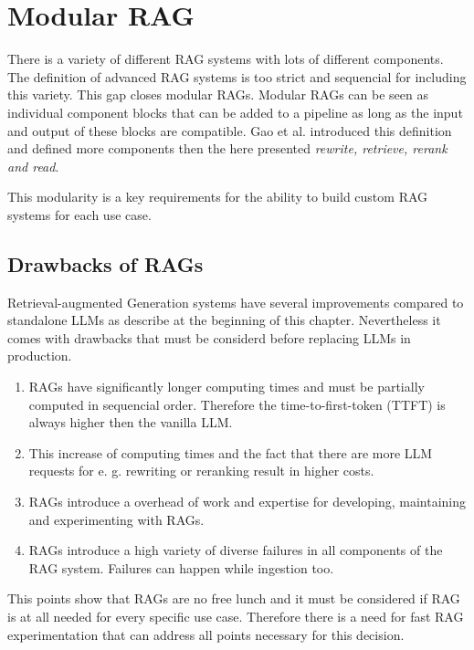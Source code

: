 \section{Modular RAG}

There is a variety of different RAG systems with lots of different components. The definition of advanced RAG systems is too strict and sequencial for including this variety. This gap closes modular RAGs. Modular RAGs can be seen as individual component blocks that can be added to a pipeline as long as the input and output of these blocks are compatible. Gao et al. introduced this definition and defined more components then the here presented \textit{rewrite, retrieve, rerank and read}.\cite{Gao.18.12.2023}

This modularity is a key requirements for the ability to build custom RAG systems for each use case.




\subsection{Drawbacks of RAGs}
\label{sec:drawbacks}
Retrieval-augmented Generation systems have several improvements compared to standalone LLMs as describe at the beginning of this chapter. Nevertheless it comes with drawbacks that must be considerd before replacing LLMs in production. 

\begin{enumerate}
    \item RAGs have significantly longer computing times and must be partially computed in sequencial order. Therefore the time-to-first-token (TTFT) is always higher then the vanilla LLM. 
    \item This increase of computing times and the fact that there are more LLM requests for e. g. rewriting or reranking result in higher costs.
    \item RAGs introduce a overhead of work and expertise for developing, maintaining and experimenting with RAGs.
    \item RAGs introduce a high variety of diverse failures in all components of the RAG system. Failures can happen while ingestion too.\\[9pt]
\end{enumerate}

This points show that RAGs are no free lunch and it must be considered if RAG is at all needed for every specific use case. Therefore there is a need for fast RAG experimentation that can address all points necessary for this decision.
